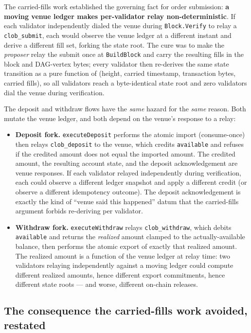The carried-fills work established the governing fact for order
submission: \textbf{a moving venue ledger makes per-validator relay
non-deterministic}. If each validator independently dialed the venue
during \texttt{Block.Verify} to relay a \texttt{clob\_submit}, each
would observe the venue ledger at a different instant and derive a
different fill set, forking the state root. The cure was to make the
\emph{proposer} relay the submit once at \texttt{BuildBlock} and carry
the resulting fills in the block and DAG-vertex bytes; every validator
then re-derives the same state transition as a pure function of
(height, carried timestamp, transaction bytes, carried fills), so all
validators reach a byte-identical state root and zero validators dial
the venue during verification.

The deposit and withdraw flows have the \emph{same} hazard for the
\emph{same} reason. Both mutate the venue ledger, and both depend on
the venue's response to a relay:

\begin{itemize}[leftmargin=2em,nosep]
\item \textbf{Deposit fork.} \texttt{executeDeposit} performs the
  atomic import (consume-once) then relays \texttt{clob\_deposit} to
  the venue, which credits \texttt{available} and refuses if the
  credited amount does not equal the imported amount. The credited
  amount, the resulting account state, and the deposit acknowledgement
  are venue responses. If each validator relayed independently during
  verification, each could observe a different ledger snapshot and
  apply a different credit (or observe a different idempotency
  outcome). The deposit acknowledgement is exactly the kind of
  ``venue said this happened'' datum that the carried-fills argument
  forbids re-deriving per validator.
\item \textbf{Withdraw fork.} \texttt{executeWithdraw} relays
  \texttt{clob\_withdraw}, which debits \texttt{available} and returns
  the \emph{realized} amount clamped to the actually-available balance,
  then performs the atomic export of exactly that realized amount. The
  realized amount is a function of the venue ledger at relay time: two
  validators relaying independently against a moving ledger could
  compute different realized amounts, hence different export
  commitments, hence different state roots --- and worse, different
  on-chain releases.
\end{itemize}

\subsection{The consequence the carried-fills work avoided, restated}

